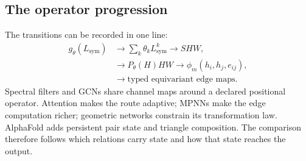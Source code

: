 \subsection{The operator progression}

The transitions can be recorded in one line:
\begin{equation}
\boxed{
\begin{aligned}
g_\theta(L_{\mathrm{sym}})&\longrightarrow\sum_k\theta_kL_{\mathrm{sym}}^k\longrightarrow SHW,\\
&\longrightarrow P_\theta(H)HW
\longrightarrow\phi_m(h_i,h_j,e_{ij}),\\
&\longrightarrow\text{typed equivariant edge maps}.
\end{aligned}}
\label{eq:book-gcn-operator-progression}
\end{equation}
Spectral filters and GCNs share channel maps around a declared positional operator.  Attention
makes the route adaptive; MPNNs make the edge computation richer; geometric networks constrain
its transformation law.  AlphaFold adds persistent pair state and triangle composition.  The
comparison therefore follows which relations carry state and how that state reaches the output.
